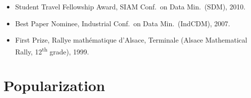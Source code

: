 \documentclass[line,mm]{res}
\newcounter{x}
\newcounter{y}
\newcounter{z}
\begin{document}
\begin{resume}
\begin{itemize}
{      \href{https://www.slideshare.net/kunegis/presentation-5758116}{\faSlideshare}
    }
    Student Travel Award, Int.\ Conf.\ on Inf.\ and Knowl.\ Manag.\ (CIKM), 2010. 
  \item 
    Student Travel Fellowship Award, SIAM Conf.\ on Data Min.\ (SDM),
    2010.  
  \item 
    Best Paper Nominee, Industrial Conf.\ on Data Min.\ (IndCDM), 2007.    
  \item 
    First Prize, Rallye mathématique d'Alsace, Terminale (Alsace
    Mathematical Rally, 12\textsuperscript{th} grade), 1999. 
\end{itemize}

\section{Popularization}     


\end{resume}
\end{document}
